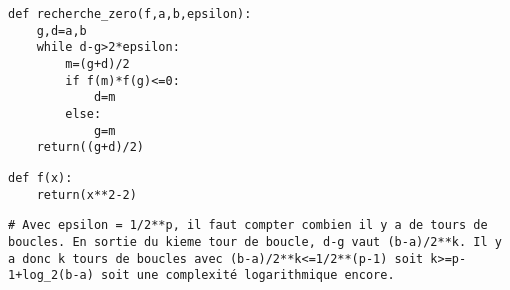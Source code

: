	\ifprof
\begin{corrige}
\begin{lstlisting}
def recherche_zero(f,a,b,epsilon):
    g,d=a,b
    while d-g>2*epsilon:
        m=(g+d)/2
        if f(m)*f(g)<=0:
            d=m
        else:
            g=m
    return((g+d)/2)

\end{lstlisting}
\end{corrige}
\else
\fi

\ifprof
\begin{corrige}
\begin{lstlisting}
def f(x):
    return(x**2-2)
\end{lstlisting}

\begin{lstlisting}
# Avec epsilon = 1/2**p, il faut compter combien il y a de tours de boucles. En sortie du kieme tour de boucle, d-g vaut (b-a)/2**k. Il y a donc k tours de boucles avec (b-a)/2**k<=1/2**(p-1) soit k>=p-1+log_2(b-a) soit une complexité logarithmique encore.
\end{lstlisting}
\end{corrige}
\else
\fi	

